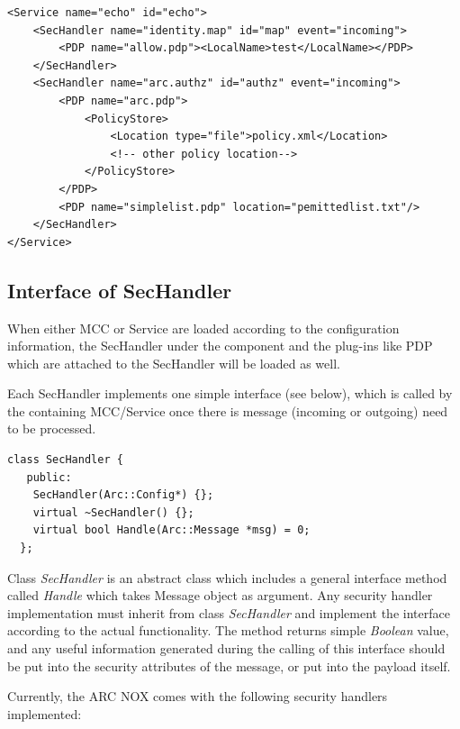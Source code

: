 \documentclass{article}                            %
\begin{document}
\begin{verbatim}
<Service name="echo" id="echo">
    <SecHandler name="identity.map" id="map" event="incoming">
        <PDP name="allow.pdp"><LocalName>test</LocalName></PDP>
    </SecHandler>
    <SecHandler name="arc.authz" id="authz" event="incoming">
        <PDP name="arc.pdp">
            <PolicyStore>
                <Location type="file">policy.xml</Location>
                <!-- other policy location-->
            </PolicyStore>
        </PDP>
        <PDP name="simplelist.pdp" location="pemittedlist.txt"/>
    </SecHandler>
</Service>
\end{verbatim}


\subsection{Interface of SecHandler} %
\label{subsec:interface_sechandler}

When either MCC or Service are loaded according to the configuration information, the SecHandler under the component and the plug-ins like PDP which are attached to the SecHandler will be loaded as well.

Each SecHandler implements one simple interface (see below), which is called by the containing MCC/Service once there is message (incoming or outgoing) need to be processed.

\begin{verbatim}
class SecHandler {
   public:
    SecHandler(Arc::Config*) {};
    virtual ~SecHandler() {};
    virtual bool Handle(Arc::Message *msg) = 0;
  };
\end{verbatim}

Class \textit{SecHandler} is an abstract class which includes a general interface method called \textit{Handle} which takes Message object as argument. Any security handler implementation must inherit from class \textit{SecHandler} and implement the interface according to the actual functionality. The method returns simple \textit{Boolean} value, and any useful information generated during the calling of this interface should be put into the security attributes of the message, or put into the payload itself.

Currently, the ARC NOX comes with the following security handlers implemented:
\end{document}
